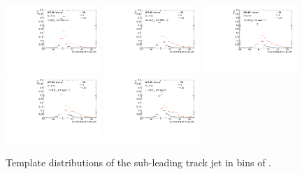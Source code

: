 \begin{figure}[htbp]
  \centering
 \includegraphics[width=0.32\textwidth]{figures/gbb/Sub_Sd0_Fits/Canv_FitTemplate_-3-logM_bb_over_p_TG--22_LpT_INF_SpT_INF_y.pdf}
 \includegraphics[width=0.32\textwidth]{figures/gbb/Sub_Sd0_Fits/Canv_FitTemplate_-22-logM_bb_over_p_TG--19_LpT_INF_SpT_INF_y.pdf}
 \includegraphics[width=0.32\textwidth]{figures/gbb/Sub_Sd0_Fits/Canv_FitTemplate_-19-logM_bb_over_p_TG--15_LpT_INF_SpT_INF_y.pdf}\\
 \includegraphics[width=0.32\textwidth]{figures/gbb/Sub_Sd0_Fits/Canv_FitTemplate_-15-logM_bb_over_p_TG--11_LpT_INF_SpT_INF_y.pdf}
 \includegraphics[width=0.32\textwidth]{figures/gbb/Sub_Sd0_Fits/Canv_FitTemplate_-11-logM_bb_over_p_TG-0_LpT_INF_SpT_INF_y.pdf}

\caption{Template \subsdzero distributions of the sub-leading track jet in bins of \mpt. }
  \label{fig:fracmasspt-template-subleading}
\end{figure}


